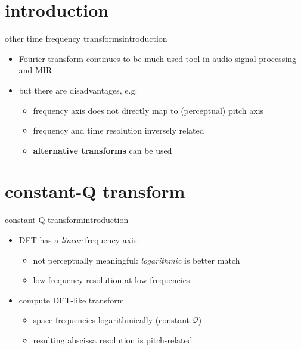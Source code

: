    \section[intro]{introduction}
        \begin{frame}{other time frequency transforms}{introduction}
            \begin{itemize}
                \item   Fourier transform continues to be much-used tool in audio signal processing and MIR
                \bigskip
                \item   but there are disadvantages, e.g.
                    \begin{itemize}
                        \item   frequency axis does not directly map to (perceptual) pitch axis
                        \item   frequency and time resolution inversely related
                        \smallskip
                        \item<2->[$\Rightarrow$] \textbf{alternative transforms} can be used
                    \end{itemize}
            \end{itemize}
        \end{frame}
        
    \section[CQT]{constant-Q transform}
        \begin{frame}{constant-Q transform}{introduction}
            \begin{itemize}
                \item<1-> DFT has a \textit{linear} frequency axis:
                    \begin{itemize}
                        \item	not perceptually meaningful: \textit{logarithmic} is better match
                        \item	low frequency resolution at low frequencies
                    \end{itemize}
                \bigskip
                \item<2->[$\Rightarrow$] compute DFT-like transform {\color{gtgold}{at specific frequencies}}
                    \begin{itemize}
                        \item   space frequencies logarithmically (constant $\mathcal{Q}$)
                        \item   resulting abscissa resolution is pitch-related
                    \end{itemize}
            \end{itemize}
            
            \bigskip
        \end{frame}	

